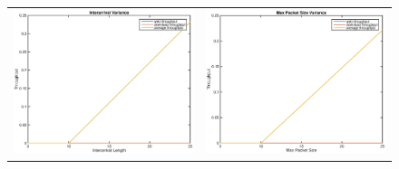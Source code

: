 \begin{figure}
\begin{tabular}{cc}
\includegraphics[scale=0.35]{../../src/fig-simulation_web_download-interarival-1_5.000000e-01_1_5_1_1_25.eps} & \includegraphics[scale=0.35]{../../src/fig-simulation_web_download-maxpackets-1_1_1_5_1_1_25.eps} \\

\end{tabular}
\end{figure}
